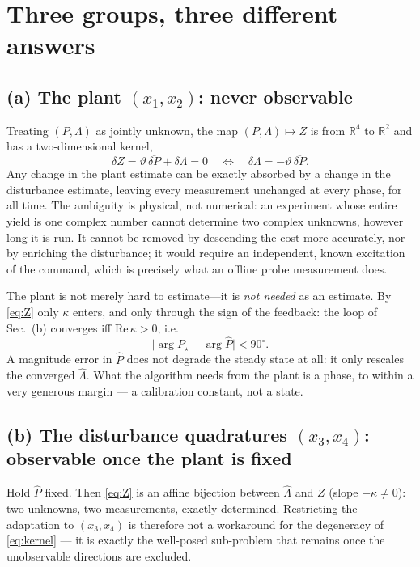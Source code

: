 \documentclass[11pt]{article}
\begin{document}
\section{Three groups, three different answers}

\subsection*{(a) The plant $(x_1,x_2)$: never observable}

Treating $(P,\Lambda)$ as jointly unknown, the map $(P,\Lambda)\mapsto Z$
is from $\mathbb{R}^4$ to $\mathbb{R}^2$ and has a two-dimensional kernel,
\begin{equation}
  \delta Z=\vartheta\,\overline{\delta P}+\delta\Lambda=0
  \quad\Longleftrightarrow\quad
  \delta\Lambda=-\vartheta\,\overline{\delta P}.
  \label{eq:kernel}
\end{equation}
Any change in the plant estimate can be exactly absorbed by a change in the
disturbance estimate, leaving every measurement unchanged at every phase,
for all time. The ambiguity is physical, not numerical: an experiment whose
entire yield is one complex number cannot determine two complex unknowns,
however long it is run. It cannot be
removed by descending the cost more accurately, nor by enriching the
disturbance; it would require an independent, known excitation of the
command, which is precisely what an offline probe measurement does.

The plant is not merely hard to estimate---it is \emph{not needed} as an
estimate. By \eqref{eq:Z} only $\kappa$ enters, and only through the sign
of the feedback: the loop of Sec.~(b) converges iff $\mathrm{Re}\,\kappa>0$,
i.e.
\begin{equation}
  \big|\arg P_\star-\arg\hat P\big|<90^\circ .
  \label{eq:margin}
\end{equation}
A magnitude error in $\hat P$ does not degrade the steady state at all: it
only rescales the converged $\hat\Lambda$. What the algorithm needs from
the plant is a phase, to within a very generous margin --- a calibration
constant, not a state.

\subsection*{(b) The disturbance quadratures $(x_3,x_4)$: observable once the plant is fixed}

Hold $\hat P$ fixed. Then \eqref{eq:Z} is an affine bijection between
$\hat\Lambda$ and $Z$ (slope $-\kappa\neq0$): two unknowns, two
measurements, exactly determined. Restricting the adaptation to
$(x_3,x_4)$ is therefore not a workaround for the degeneracy of
\eqref{eq:kernel} --- it is exactly the well-posed sub-problem that remains
once the unobservable directions are excluded.
\end{document}

